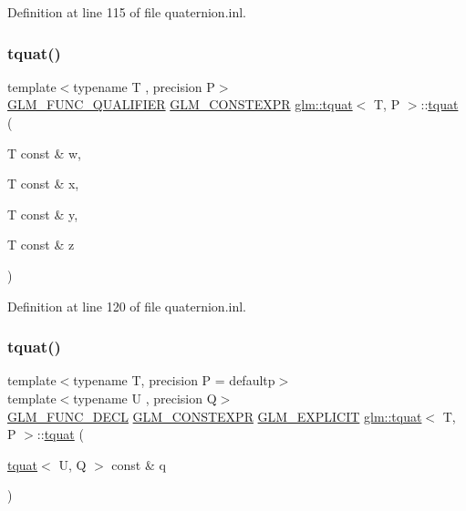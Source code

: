 Definition at line 115 of file quaternion.\+inl.

\mbox{\label{structglm_1_1tquat_ace891412cac049ef9bbafe069779a2c2}} 
\subsubsection{\texorpdfstring{tquat()}{tquat()}\hspace{0.1cm}{\footnotesize\ttfamily [6/13]}}
{\footnotesize\ttfamily template$<$typename T , precision P$>$ \\
\mbox{\hyperlink{setup_8hpp_a33fdea6f91c5f834105f7415e2a64407}{G\+L\+M\+\_\+\+F\+U\+N\+C\+\_\+\+Q\+U\+A\+L\+I\+F\+I\+ER}} \mbox{\hyperlink{setup_8hpp_a08b807947b47031d3a511f03f89645ad}{G\+L\+M\+\_\+\+C\+O\+N\+S\+T\+E\+X\+PR}} \mbox{\hyperlink{structglm_1_1tquat}{glm\+::tquat}}$<$ T, P $>$\+::\mbox{\hyperlink{structglm_1_1tquat}{tquat}} (\begin{DoxyParamCaption}\item[{T const \&}]{w,  }\item[{T const \&}]{x,  }\item[{T const \&}]{y,  }\item[{T const \&}]{z }\end{DoxyParamCaption})}



Definition at line 120 of file quaternion.\+inl.

\mbox{\label{structglm_1_1tquat_ad431b0f391ccc1e5d89f12306dc00114}} 
\subsubsection{\texorpdfstring{tquat()}{tquat()}\hspace{0.1cm}{\footnotesize\ttfamily [7/13]}}
{\footnotesize\ttfamily template$<$typename T, precision P = defaultp$>$ \\
template$<$typename U , precision Q$>$ \\
\mbox{\hyperlink{setup_8hpp_ab2d052de21a70539923e9bcbf6e83a51}{G\+L\+M\+\_\+\+F\+U\+N\+C\+\_\+\+D\+E\+CL}} \mbox{\hyperlink{setup_8hpp_a08b807947b47031d3a511f03f89645ad}{G\+L\+M\+\_\+\+C\+O\+N\+S\+T\+E\+X\+PR}} \mbox{\hyperlink{setup_8hpp_a6c74f5a5e7b134ab69023ff9a30d4d5d}{G\+L\+M\+\_\+\+E\+X\+P\+L\+I\+C\+IT}} \mbox{\hyperlink{structglm_1_1tquat}{glm\+::tquat}}$<$ T, P $>$\+::\mbox{\hyperlink{structglm_1_1tquat}{tquat}} (\begin{DoxyParamCaption}\item[{\mbox{\hyperlink{structglm_1_1tquat}{tquat}}$<$ U, Q $>$ const \&}]{q }\end{DoxyParamCaption})}

